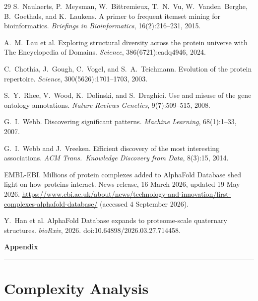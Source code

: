 \documentclass[10pt,a4paper,twocolumn]{article}
\begin{document}
\begin{thebibliography}{29}
S.~Naulaerts, P.~Meysman, W.~Bittremieux, T.~N.~Vu, W.~Vanden~Berghe, B.~Goethals, and K.~Laukens.
\newblock A primer to frequent itemset mining for bioinformatics.
\newblock \emph{Briefings in Bioinformatics}, 16(2):216--231, 2015.

A.~M.~Lau et al.
\newblock Exploring structural diversity across the protein universe with The Encyclopedia of Domains.
\newblock \emph{Science}, 386(6721):eadq4946, 2024.

C.~Chothia, J.~Gough, C.~Vogel, and S.~A.~Teichmann.
\newblock Evolution of the protein repertoire.
\newblock \emph{Science}, 300(5626):1701--1703, 2003.

S.~Y.~Rhee, V.~Wood, K.~Dolinski, and S.~Draghici.
\newblock Use and misuse of the gene ontology annotations.
\newblock \emph{Nature Reviews Genetics}, 9(7):509--515, 2008.

G.~I.~Webb.
\newblock Discovering significant patterns.
\newblock \emph{Machine Learning}, 68(1):1--33, 2007.

G.~I.~Webb and J.~Vreeken.
\newblock Efficient discovery of the most interesting associations.
\newblock \emph{ACM Trans.\ Knowledge Discovery from Data}, 8(3):15, 2014.

EMBL-EBI.
\newblock Millions of protein complexes added to AlphaFold Database shed light on how proteins interact.
\newblock News release, 16 March 2026, updated 19 May 2026. \url{https://www.ebi.ac.uk/about/news/technology-and-innovation/first-complexes-alphafold-database/} (accessed 4 September 2026).

Y.~Han et al.
\newblock AlphaFold Database expands to proteome-scale quaternary structures.
\newblock \emph{bioRxiv}, 2026. doi:10.64898/2026.03.27.714458.

\end{thebibliography}

\clearpage
\appendix
\onecolumn

\begin{center}
{\Large\bfseries Appendix}
\end{center}
\vspace{0.5em}
\hrule
\vspace{1.5em}

\section{Complexity Analysis}
\label{app:complexity}
\end{document}
